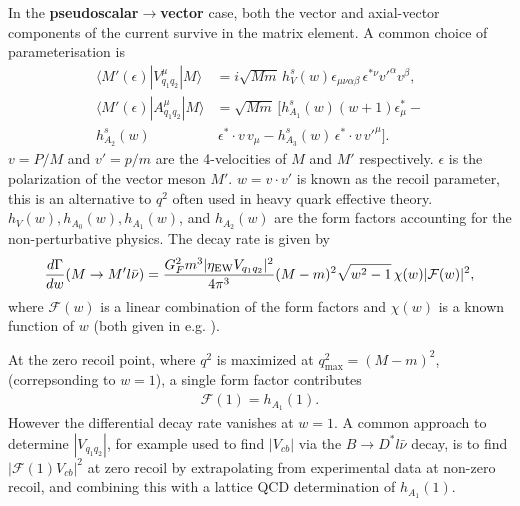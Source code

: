 In the {\bf{pseudoscalar$\to$vector}} case, both the vector and axial-vector components of the current survive in the matrix element. A common choice of parameterisation is
\begin{align}
  \langle M'(\epsilon)| V_{q_1q_2}^{\mu} | M \rangle &= i \sqrt{Mm}\, h^s_V(w) \epsilon_{\mu\nu\alpha\beta} \,\epsilon^{*\nu} v'^{\alpha} v^{\beta}, \\
  \langle M'(\epsilon)| A_{q_1q_2}^{\mu} | M \rangle &= \sqrt{Mm} \, [ h^s_{A_1}(w) (w+1) \epsilon^*_{\mu} - \\ \nonumber
    h^s_{A_2}(w)& \,\epsilon^*\cdot v \,v_{\mu} - h^s_{A_3}(w) \,\epsilon^*\cdot v \, v'^{\mu} ].
\end{align}
$v = P/M$ and $v' = p/m$ are the 4-velocities of $M$ and $M'$ respectively. $\epsilon$ is the polarization of the vector meson $M'$. $w = v\cdot v'$ is known as the recoil parameter, this is an alternative to $q^2$ often used in heavy quark effective theory. $h_V(w),h_{A_0}(w),h_{A_1}(w)$, and $h_{A_2}(w)$ are the form factors accounting for the non-perturbative physics. The decay rate is given by
\begin{align}
  {d\Gamma \over dw}(M\to M' l\bar{\nu}) = {G_F^2 m^3 | \eta_{\text{EW}} V_{q_1q_2} |^2 \over 4\pi^3 } (M-m)^2 \sqrt{w^2-1} \, \chi(w) |\mathcal{F}(w)|^2,
\end{align}
where $\mathcal{F}(w)$ is a linear combination of the form factors and $\chi(w)$ is a known function of $w$ (both given in e.g. \cite{Aubert:2006cx}).

At the zero recoil point, where $q^2$ is maximized at $q^2_{\text{max}} = (M-m)^2$, (correpsonding to $w=1$), a single form factor contributes
\begin{align}
  \mathcal{F}(1) = h_{A_1}(1).
\end{align}
However the differential decay rate vanishes at $w=1$. A common approach to determine $|V_{q_1q_2}|$, for example used to find $|V_{cb}|$ via the $B\to D^*l\bar{\nu}$ decay, is to find $|\mathcal{F}(1)V_{cb}|^2$ at zero recoil by extrapolating from experimental data at non-zero recoil, and combining this with a lattice QCD determination of $h_{A_1}(1)$.

